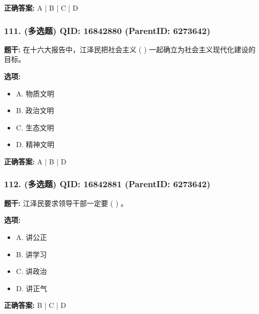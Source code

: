 \documentclass[12pt,UTF8]{ctexart}
\begin{document}
\textbf{正确答案:}
A | B | C | D

\vspace{0.3em}\hrulefill\vspace{0.7em}

\subsubsection*{111. (多选题) \small QID: 16842880 (ParentID: 6273642)}

\textbf{题干:}
在十六大报告中，江泽民把社会主义 ( ) 一起确立为社会主义现代化建设的目标。



\textbf{选项:}
\begin{itemize}[leftmargin=*]

  \item A. 物质文明

  \item B. 政治文明

  \item C. 生态文明

  \item D. 精神文明

\end{itemize}

\textbf{正确答案:}
A | B | D

\vspace{0.3em}\hrulefill\vspace{0.7em}

\subsubsection*{112. (多选题) \small QID: 16842881 (ParentID: 6273642)}

\textbf{题干:}
江泽民要求领导干部一定要 ( ) 。



\textbf{选项:}
\begin{itemize}[leftmargin=*]

  \item A. 讲公正

  \item B. 讲学习

  \item C. 讲政治

  \item D. 讲正气

\end{itemize}

\textbf{正确答案:}
B | C | D
\end{document}
